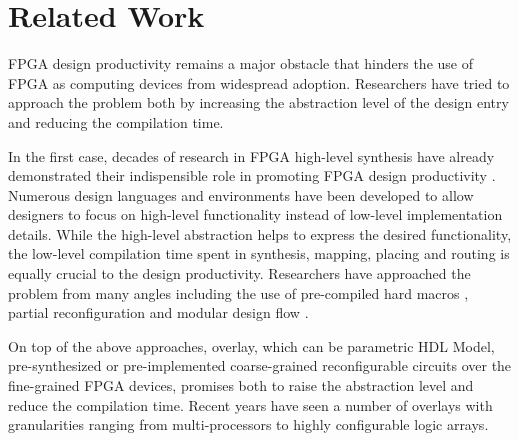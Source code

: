 \section{Related Work}\label{sec:relatedwork}
FPGA design productivity remains a major obstacle that hinders the use of FPGA as computing devices from widespread adoption. Researchers have tried to approach the problem both by increasing the abstraction level of the design entry and reducing the compilation time.

In the first case, decades of research in FPGA high-level synthesis have already demonstrated their indispensible role in promoting FPGA design productivity \cite{cong2011high}. Numerous design languages and environments \cite{cardoso2010compiling} have been developed to allow designers to focus on high-level functionality instead of low-level implementation details. While the high-level abstraction helps to express the desired functionality, the low-level compilation time spent in synthesis, mapping, placing and routing is equally crucial to the design productivity. Researchers have approached the problem from many angles including the use of pre-compiled hard macros \cite{lavin2011}, partial reconfiguration and modular design flow \cite{Frangieh2010}. 

On top of the above approaches, overlay, which can be parametric HDL Model, pre-synthesized or pre-implemented coarse-grained reconfigurable circuits over the fine-grained FPGA devices, promises both to raise the abstraction level and reduce the compilation time. Recent years have seen a number of overlays \cite{Lebedev2010,kissler2006dynamically,unnikrishnan2009application,Yiannacouras2009FPS,Guy2012VENICE,Jeffrey2011potential} with granularities ranging from multi-processors to highly configurable logic arrays. 

